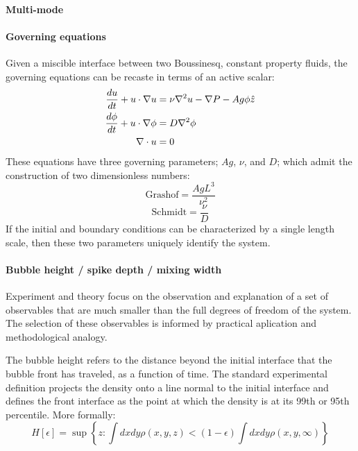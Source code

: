 \paragraph{Multi-mode}

\paragraph{Governing equations}
Given a miscible interface between two Boussinesq,  constant property fluids, the governing equations can be recaste in terms of an active scalar:
\begin{align}
\frac{d u}{d t} + u \cdot \nabla u &= \nu \nabla^2 u - \nabla P - A g \phi \hat{z}\\
\frac{d \phi}{d t} + u \cdot \nabla \phi &= D \nabla^2 \phi \\
\nabla \cdot u  &= 0
\end{align}
These equations have three governing parameters; $Ag$, $\nu$, and $D$; which admit the construction of two dimensionless numbers:
\begin{equation}
\text{Grashof} = \frac{Ag L^3}{\nu^2}
\end{equation}
\begin{equation}
\text{Schmidt} = \frac{\nu}{D}
\end{equation}
If the initial and boundary conditions can be characterized by a single length scale, then these two parameters uniquely identify the system.

\paragraph{Bubble height / spike depth / mixing width}

Experiment and theory focus on the observation and explanation of a set of observables that are much smaller than the full degrees of freedom of the system.
The selection of these observables is informed by practical aplication and methodological analogy.


The bubble height refers to the distance beyond the initial interface that the bubble front has traveled, as a function of time.
The standard experimental definition projects the density onto a line normal to the initial interface and defines the front interface as the point at which the density is at its 99th or 95th percentile.
More formally:
\begin{equation}
H[\epsilon] = \sup \left\{z : \int dx dy \rho(x,y,z) < (1-\epsilon) \int dx dy \rho(x,y,\infty) \right\}
\end{equation}



